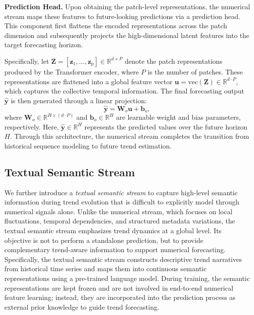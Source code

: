 \documentclass[Afour,sageh,times]{sagej}
\begin{document}
{\textbf{Prediction Head.} Upon obtaining the patch-level representations, the numerical stream maps these features to future-looking predictions via a prediction head. This component first flattens the encoded representations across the patch dimension and subsequently projects the high-dimensional latent features into the target forecasting horizon.

Specifically, let $\mathbf{Z} = [\mathbf{z}_1, \dots, \mathbf{z}_p] \in \mathbb{R}^{d \times P}$ denote the patch representations produced by the Transformer encoder, where $P$ is the number of patches. These representations are flattened into a global feature vector $\mathbf{u} = \mathrm{vec}(\mathbf{Z}) \in \mathbb{R}^{d \cdot P}$, which captures the collective temporal information. 
The final forecasting output $\mathbf{\hat{y}}$ is then generated through a linear projection:
\begin{equation}
\mathbf{\hat{y}} = \mathbf{W}_o \mathbf{u} + \mathbf{b}_o,
\end{equation}
where $\mathbf{W}_o \in \mathbb{R}^{H \times (d \cdot P)}$ and $\mathbf{b}_o \in \mathbb{R}^H$ are learnable weight and bias parameters, respectively. Here, $\mathbf{\hat{y}} \in \mathbb{R}^H$ represents the predicted values over the future horizon $H$. Through this architecture, the numerical stream completes the transition from historical sequence modeling to future trend estimation.

\subsection{Textual Semantic Stream}
We further introduce a \emph{textual semantic stream} to capture high-level semantic information during trend evolution that is difficult to explicitly model through numerical signals alone. Unlike the numerical stream, which focuses on local fluctuations, temporal dependencies, and structured metadata variations, the textual semantic stream emphasizes trend dynamics at a global level. Its objective is not to perform a standalone prediction, but to provide complementary trend-aware information to support numerical forecasting.
Specifically, the textual semantic stream constructs descriptive trend narratives from historical time series and maps them into continuous semantic representations using a pre-trained language model. During training, the semantic representations are kept frozen and are not involved in end-to-end numerical feature learning; instead, they are incorporated into the prediction process as external prior knowledge to guide trend forecasting.

}
\end{document}
